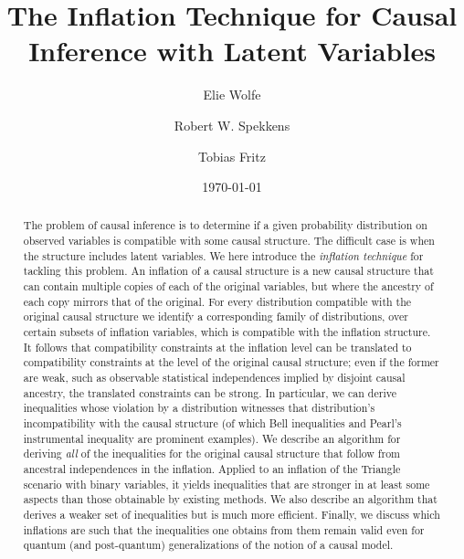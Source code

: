 \documentclass[aps,english,superscriptaddress,onecolumn,twoside,longbibliography,pra,floatfix,fleqn,nofootinbib]{revtex4-1}%
\theoremstyle{definition}
\newcounter{example}[section]
\begin{document}
\title{The Inflation Technique for Causal Inference with Latent Variables}

\author{Elie Wolfe}

\author{Robert W. Spekkens}

\author{Tobias Fritz}

\date{\today}


\begin{abstract}

The problem of causal inference is to determine if a given probability distribution on observed variables is compatible with some causal structure. The difficult case is when the structure includes latent variables.  We here introduce the \emph{inflation technique} for tackling this problem. An inflation of a causal structure is a new causal structure that can contain multiple copies of each of the original variables, but where the ancestry of each copy mirrors that of the original. For every distribution compatible with the original causal structure we identify a corresponding family of distributions, over certain subsets of inflation variables, which is compatible with the inflation structure. It follows that compatibility constraints at the inflation level can be translated to compatibility constraints at the level of the original causal structure; even if the former are weak, such as observable statistical independences implied by disjoint causal ancestry, the translated constraints can be strong. In particular, we can derive inequalities whose violation by a distribution witnesses that distribution's incompatibility with the causal structure (of which Bell inequalities and Pearl's instrumental inequality are prominent examples). We describe an algorithm for deriving \emph{all} of the inequalities for the original causal structure that follow from ancestral independences in the inflation. Applied to an inflation of the Triangle scenario with binary variables, it yields inequalities that are stronger in at least some aspects than those obtainable by existing methods. We also describe an algorithm that derives a weaker set of inequalities but is much more efficient. Finally, we discuss which inflations are such that the inequalities one obtains from them remain valid even for quantum (and post-quantum) generalizations of the notion of a causal model.


\end{abstract}
\end{document}
